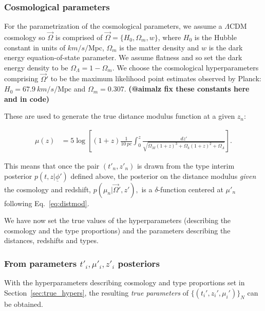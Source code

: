 \documentclass[12pt, twocolumn]{emulateapj}
\newcommand{\textul}{\underline}
\begin{document}
\subsubsection{Cosmological parameters}
\label{sec:cosmohypers}

For the parametrization of the cosmological parameters, we assume a $\Lambda$CDM cosmology so $\vec{\Omega}$ is comprised of $\vec{\Omega} = \{H_{0}, \Omega_{m}, w\}$, where $H_0$ is the Hubble constant in units of $km/s/\mathrm{Mpc}$, $\Omega_m$ is the matter density and $w$ is the dark energy equation-of-state parameter. We assume flatness and so set the dark energy density to be $\Omega_\Lambda = 1-\Omega_m$.  
We choose the cosmological hyperparameters comprising $\vec{\Omega}'$ to be the maximum likelihood point estimates observed by Planck: $H_{0}=67.9\ km/s/\mathrm{Mpc}$ and $\Omega_{m}=0.307$.  \textbf{(@aimalz fix these constants here and in code)}  

These are used to generate the true distance modulus function at a given $z_{n}$:

\begin{widetext}
\begin{align}
\label{eq:distmod}
\mu(z) &= 5\log\left[(1+z)\frac{1}{10\ pc}\int_{0}^{z}\frac{dz'}{\sqrt{\Omega_{M}(1+z)^{3}+\Omega_{k}(1+z)^{2}+\Omega_{\Lambda}}}\right].
\end{align}
\end{widetext}

This means that once the pair $(t'_{n}, z'_{n})$ is drawn from the type interim posterior $p(t, z | \textul{\phi}')$ defined above, the posterior on the distance modulus \textit{given} the cosmology and redshift, $p(\mu_{n} | \vec{\Omega}', z'),$ is a $\delta$-function centered at $\mu'_{n}$ following Eq.~\ref{eq:distmod}.  

We have now set the true values of the hyperparameters (describing the cosmology and the type proportions) and the parameters describing the distances, redshifts and types.

\subsubsection{From parameters $t'_i,\mu'_i, z'_i$ posteriors}
\label{sec:drawmock}

With the hyperparameters describing cosmology and type proportions set in Section~\ref{sec:true_hypers}, the resulting \textit{true parameters} of  $\{(t_{i}', z_{i}', \mu_{i}')\}_{N}$ can be obtained.
\end{document}
